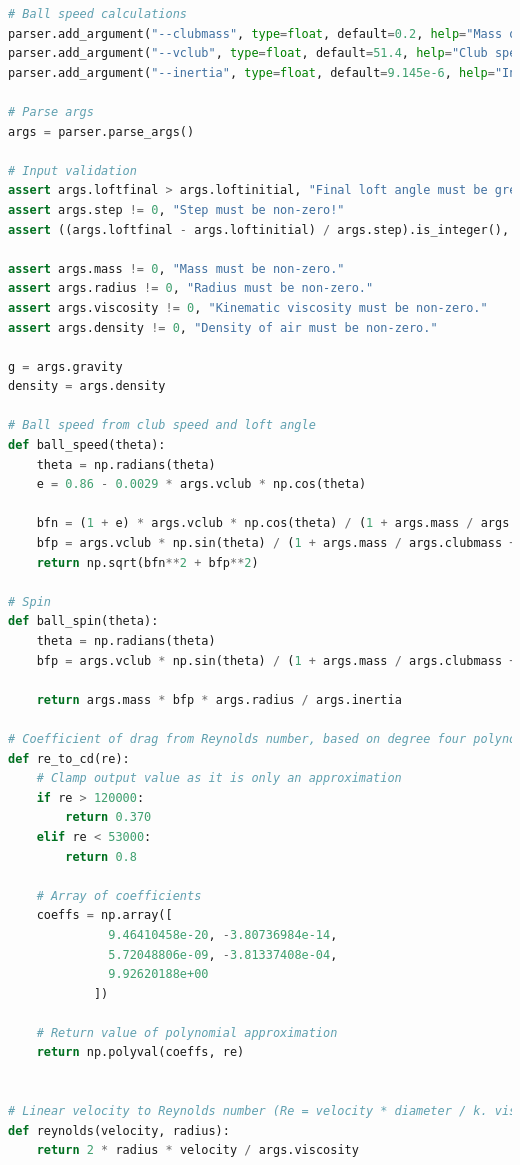 \documentclass[12pt]{article}
\begin{document}
\begin{lstlisting}[language=Python, caption=Python model, style=PythonStyle, basicstyle=\tiny]
# Ball speed calculations
parser.add_argument("--clubmass", type=float, default=0.2, help="Mass of club head (kg)")
parser.add_argument("--vclub", type=float, default=51.4, help="Club speed (m/s)")
parser.add_argument("--inertia", type=float, default=9.145e-6, help="Inertia of golf ball")

# Parse args
args = parser.parse_args()

# Input validation
assert args.loftfinal > args.loftinitial, "Final loft angle must be gretaer than initial loft angle!"
assert args.step != 0, "Step must be non-zero!"
assert ((args.loftfinal - args.loftinitial) / args.step).is_integer(), "Step size must divide the change in loft angle!"

assert args.mass != 0, "Mass must be non-zero."
assert args.radius != 0, "Radius must be non-zero."
assert args.viscosity != 0, "Kinematic viscosity must be non-zero."
assert args.density != 0, "Density of air must be non-zero."

g = args.gravity
density = args.density

# Ball speed from club speed and loft angle
def ball_speed(theta):
	theta = np.radians(theta)
	e = 0.86 - 0.0029 * args.vclub * np.cos(theta)

	bfn = (1 + e) * args.vclub * np.cos(theta) / (1 + args.mass / args.clubmass)
	bfp = args.vclub * np.sin(theta) / (1 + args.mass / args.clubmass + (args.mass * args.radius**2 / args.inertia))
	return np.sqrt(bfn**2 + bfp**2)

# Spin
def ball_spin(theta):
	theta = np.radians(theta)
	bfp = args.vclub * np.sin(theta) / (1 + args.mass / args.clubmass + (args.mass * args.radius**2 / args.inertia))

	return args.mass * bfp * args.radius / args.inertia

# Coefficient of drag from Reynolds number, based on degree four polynomial.
def re_to_cd(re):
	# Clamp output value as it is only an approximation
	if re > 120000:
		return 0.370
	elif re < 53000:
		return 0.8

	# Array of coefficients
	coeffs = np.array([
			  9.46410458e-20, -3.80736984e-14,
			  5.72048806e-09, -3.81337408e-04,
			  9.92620188e+00
			])

	# Return value of polynomial approximation
	return np.polyval(coeffs, re)


# Linear velocity to Reynolds number (Re = velocity * diameter / k. viscosity)
def reynolds(velocity, radius):
	return 2 * radius * velocity / args.viscosity



\end{lstlisting}
\end{document}

